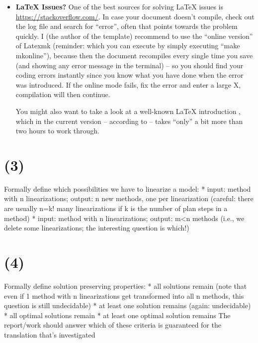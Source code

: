 \begin{itemize}
  In addition to the commands \verb!citep{}! and \verb!cite{}!, \verb!\citeauthor{}! is sometimes useful. This just lists the author(s), but without the year. I.e., it's an alternative  to \verb!cite{}! that you should use when you want to mention the authors whereas you used similar citations before so that there is just no need to add the year again.
  
  Also note that you can easily cite multiple works with one command as shown in (the code of) this sentence \citep{Cooper2015SuperfluidVacuumTheory,Smith2021Wubalubadubdub}.

  
  \item \textbf{\LaTeX{} Issues?} One of the best sources for solving \LaTeX{} issues is \url{https://stackoverflow.com/}. In case your document doesn't compile, check out the log file and search for ``error'', often that points towards the problem quickly. I (the author of the template) recommend to use the ``online version'' of Latexmk (reminder: which you can execute by simply executing ``make mkonline''), because then the document recompiles every single time you save (and showing any error message in the terminal) -- so you should find your coding errors instantly since you know what you have done when the error was introduced. If the online mode fails, fix the error and enter a large X, compilation will then continue.

  You might also want to take a look at a well-known \LaTeX{} introduction \citep{Oetiker2021LatexIntroduction}, which in the current version -- according to \citeauthor{Oetiker2021LatexIntroduction} -- takes ``only'' a bit more than two hours to work through.
\end{itemize}


\section{(3)}
Formally define which possibilities we have to linearize a model:
* input: method with n linearizations; output: n new methods, one per linearization (careful: there are usually n=k! many linearizations if k is the number of plan steps in a method)
* input: method with n linearizations; output: m<n methods (i.e., we delete some linearizations; the interesting question is which!)

\section{(4)}
Formally define solution preserving properties:
* all solutions remain (note that even if 1 method with n linearizations get transformed into all n methods, this question is still undecidable)
* at least one solution remains (again: undecidable)
* all optimal solutions remain
* at least one optimal solution remains
The report/work should answer which of these criteria is guaranteed for the translation that's investigated


